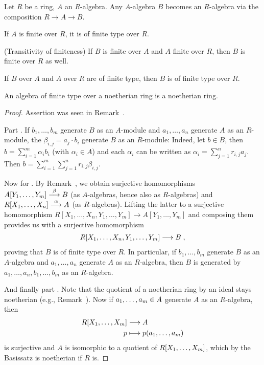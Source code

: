 \documentclass[a4paper,parskip=half,numbers=enddot, DIV=12]{scrreprt}
\begin{document}
	\begin{prop}
		Let $R$ be a ring, $A$ an $R$-algebra. Any $A$-algebra $B$ becomes an $R$-algebra via the composition $R\to A\to B$.
		\begin{alphanumerate}
			\item If $A$ is finite over $R$, it is of finite type over $R$.
			\item (Transitivity of finiteness) If $B$ is finite over $A$ and $A$ finite over $R$, then $B$ is finite over $R$ as well.
			\item If $B$ over $A$ and $A$ over $R$ are of finite type, then $B$ is of finite type over $R$.
			\item An algebra of finite type over a noetherian ring is a noetherian ring.
		\end{alphanumerate}
	\end{prop}
	\begin{proof}
		Assertion  was seen in Remark~.
		
		Part . If $b_1,\ldots,b_m$ generate $B$ as an $A$-module and $a_1,\ldots,a_n$ generate $A$ as an $R$-module, the $\beta_{i,j} = a_j\cdot b_i$ generate $B$ as an $R$-module: Indeed, let $b\in B$, then $b = \sum_{i=1}^m \alpha_i b_i$ (with $\alpha_i\in A$) and each $\alpha_i$ can be written as $\alpha_i = \sum_{j=1}^n r_{i,j}a_j$. Then $b = \sum_{i=1}^m \sum_{j=1}^n r_{i,j} \beta_{i,j}$.
		
		Now for . By Remark~, we obtain surjective homomorphisms $A[Y_1,\ldots,Y_m]\morphism[\beta]B$ (as $A$-algebras, hence also as $R$-algebras) and $R[X_1,\ldots,X_n]\morphism[\alpha]A$ (as $R$-algebras). Lifting the latter to a surjective homomorphism $R[X_1,\ldots,X_n,Y_1,\ldots,Y_m]\to A[Y_1,\ldots,Y_m]$ and composing them provides us with a surjective homomorphism
		\begin{align*}
		R[X_1,\ldots,X_n,Y_1,\ldots,Y_m]\longrightarrow B\;,
		\end{align*}
		proving that $B$ is of finite type over $R$. In particular, if $b_1,\ldots,b_m$ generate $B$ as an $A$-algebra and $a_1,\ldots,a_n$ generate $A$ as an $R$-algebra, then $B$ is generated by $a_1,\ldots, a_n, b_1,\ldots, b_m$ as an $R$-algebra.
		
		And finally part . Note that the quotient of a noetherian ring by an ideal stays noetherian (e.g., Remark~). Now if $a_1,\ldots, a_m\in A$ generate $A$ as an $R$-algebra, then
		\begin{align*}
		R[X_1,\ldots, X_m] &\longrightarrow A\\
		p&\longmapsto p(a_1,\ldots, a_m)
		\end{align*}
		is surjective and $A$ is isomorphic to a quotient of $R[X_1,\ldots, X_m]$, which by the Basissatz is noetherian if $R$ is.
	\end{proof}
	
\end{document}
